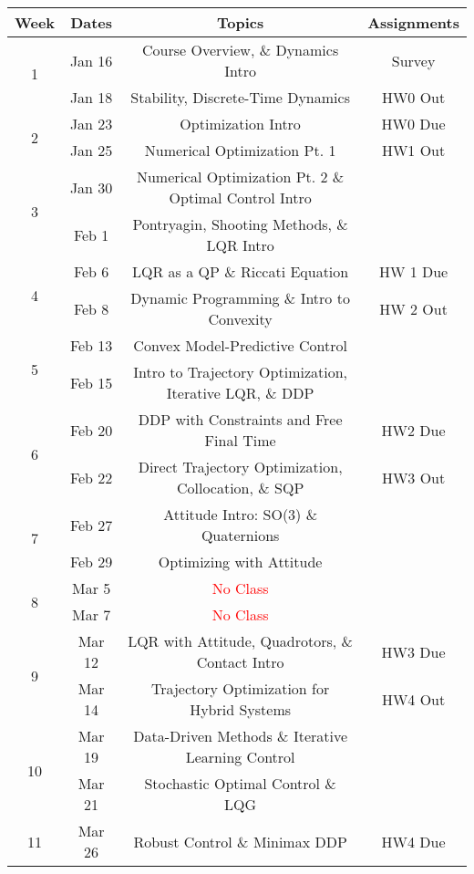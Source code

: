 \documentclass[11pt,letterpaper]{article}
\begin{document}
\begin{tabular}{c|c|c|c}
	Week & Dates & Topics & Assignments \\
	\hline
	\multirow{2}{*}{1} & Jan 16 & 
        Course Overview, \& Dynamics Intro & Survey \\
	 & Jan 18 & Stability, Discrete-Time Dynamics &  HW0 Out\\
	\hline
	\multirow{2}{*}{2} & Jan 23 &
        Optimization Intro & HW0 Due \\
	 & Jan 25 & Numerical Optimization Pt. 1 & HW1 Out \\
	\hline
	\multirow{2}{*}{3}  & Jan 30 &
        Numerical Optimization Pt. 2 \& Optimal Control Intro &  \\
	 & Feb 1 & Pontryagin, Shooting Methods, \& LQR Intro &  \\
	\hline
	\multirow{2}{*}{4}  & Feb 6 &
        LQR as a QP \& Riccati Equation & HW 1 Due \\
	 & Feb 8 & Dynamic Programming \& Intro to Convexity & HW 2 Out \\
	\hline
	\multirow{2}{*}{5}  & Feb 13 &  Convex Model-Predictive Control & \\
	 & Feb 15 & Intro to Trajectory Optimization, Iterative LQR, \& DDP &  \\
	\hline
	\multirow{2}{*}{6}  & Feb 20 & DDP with Constraints and Free Final Time & HW2 Due \\
	 & Feb 22 & Direct Trajectory Optimization, Collocation, \& SQP & HW3 Out \\
	\hline
	\multirow{2}{*}{7}  & Feb 27 & Attitude Intro: SO(3) \& Quaternions
         & \\
	 & Feb 29 &  Optimizing with Attitude& \\
	\hline
	\multirow{2}{*}{8}  & Mar 5 & 
        \textcolor{red}{No Class} & \\
	 & Mar 7 & \textcolor{red}{No Class} &   \\
	\hline
	\multirow{2}{*}{9}  & Mar 12 & LQR with Attitude, Quadrotors, \& Contact Intro
         & HW3 Due \\
	 & Mar 14 & Trajectory Optimization for Hybrid Systems & HW4 Out \\
	\hline
	\multirow{2}{*}{10}  & Mar 19 & Data-Driven Methods \& Iterative Learning Control
         &  \\
	 & Mar 21 & Stochastic Optimal Control \& LQG &   \\
	 \hline
	\multirow{2}{*}{11}  & Mar 26 &Robust Control \& Minimax DDP
         & HW4 Due \\

\end{tabular}
\end{document}
